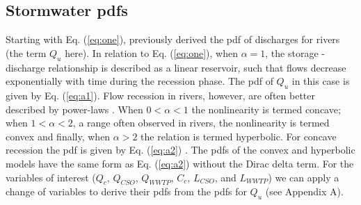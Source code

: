\documentclass{agujournal2018}
\begin{document}
\subsection{Stormwater pdfs}
Starting with Eq. (\ref{eq:one}), \citet{Botter_2009} previously derived the pdf of discharges for rivers (the term $Q_u$ here). In relation to Eq. (\ref{eq:one}), when $\alpha = 1$, the storage - discharge relationship is described as a linear reservoir, such that f\/lows decrease exponentially with time during the recession phase. The pdf of $Q_u$ in this case is given by Eq. (\ref{eq:a1}). Flow recession in rivers, however, are often better described by power-laws \citep{Wittenberg_1999}. When $0 < \alpha < 1$ the nonlinearity is termed concave; when $1 < \alpha < 2$, a range often observed in rivers, the nonlinearity is termed convex and f\/inally, when $\alpha > 2$ the relation is termed hyperbolic. For concave recession the pdf is given by Eq. (\ref{eq:a2}) \citep{Botter_2009}. The pdfs of the convex and hyperbolic models have the same form as Eq. (\ref{eq:a2}) without the Dirac delta term. For the variables of interest ($Q_c$, $Q_{CSO}$, $Q_{WWTP}$, $C_c$, $L_{CSO}$, and $L_{WWTP}$) we can apply a change of variables to derive their pdfs from the pdfs for $Q_u$ (see Appendix A). 
\end{document}
